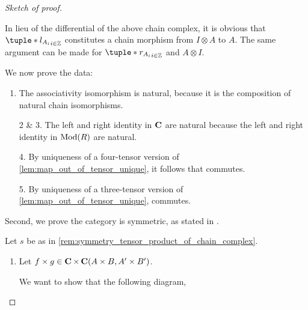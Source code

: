 \begin{proof}[Sketch of proof]
\begin{enumerate}
{            In lieu of the differential of the above chain complex, it is obvious that \( \tuple*{l_{A_i}}_{i \in \Zb} \) constitutes a chain morphism from \( I \otimes A \) to \( A \). The same argument can be made for \( \tuple*{r_{A_i}}_{i \in \Zb} \) and \( A \otimes I \).
        }
    \end{enumerate}
    We now prove the data:
    \begin{enumerate}
        \item {
            The associativity isomorphism is natural, because it is the composition of natural chain isomorphisms. 
        }
        \item[2 \& 3.] {
            The left and right identity in \( \operatorname{\mathbf{C}} \) are natural because the left and right identity in \( \operatorname{Mod}(R) \) are natural.
        }
        \item[4.] {
            By uniqueness of a four-tensor version of \autoref{lem:map_out_of_tensor_unique}, it follows that \cite[Diagram 6.1]{Borceux_1994} commutes.
        }
        \item[5.] {
            By uniqueness of a three-tensor version of \autoref{lem:map_out_of_tensor_unique}, \cite[Diagram 6.2]{Borceux_1994} commutes.
        }
    \end{enumerate}

    Second, we prove the category is symmetric, as stated in \cite[Definition 6.1.2]{Borceux_1994}.

    Let \( s \) be as in \autoref{rem:symmetry_tensor_product_of_chain_complex}.

    \begin{enumerate}
        \item {
            Let \( f \times g \in \operatorname{\mathbf{C}} \times \operatorname{\mathbf{C}} (A \times B, A' \times B') \).

            We want to show that the following diagram,
            \begin{center}
\end{center}}
\end{enumerate}
\end{proof}
